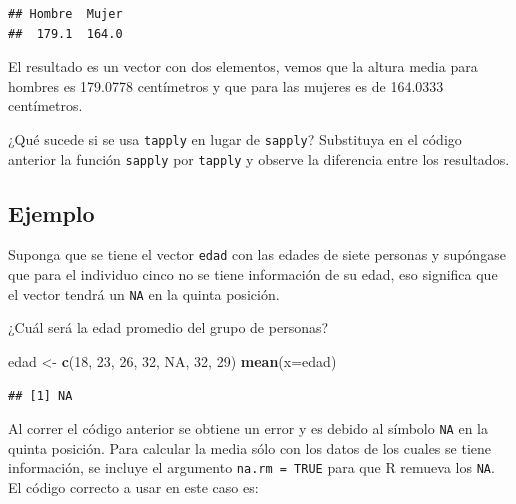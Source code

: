 \documentclass[10pt,]{krantz}
\makeatletter
\newenvironment{Shaded}{\begin{snugshade}}{\end{snugshade}}
\newcommand{\KeywordTok}[1]{\textcolor[rgb]{0.13,0.29,0.53}{\textbf{{#1}}}}
\newcommand{\DataTypeTok}[1]{\textcolor[rgb]{0.13,0.29,0.53}{{#1}}}
\newcommand{\DecValTok}[1]{\textcolor[rgb]{0.00,0.00,0.81}{{#1}}}
\newcommand{\StringTok}[1]{\textcolor[rgb]{0.31,0.60,0.02}{{#1}}}
\newcommand{\OtherTok}[1]{\textcolor[rgb]{0.56,0.35,0.01}{{#1}}}
\newcommand{\NormalTok}[1]{{#1}}
\newenvironment{kframe}{%
\medskip{}
\setlength{\fboxsep}{.8em}
 \def\at@end@of@kframe{}%
 \ifinner\ifhmode%
  \def\at@end@of@kframe{\end{minipage}}%
  \begin{minipage}{\columnwidth}%
 \fi\fi%
 \def\FrameCommand##1{\hskip\@totalleftmargin \hskip-\fboxsep
 \colorbox{shadecolor}{##1}\hskip-\fboxsep
     \hskip-\linewidth \hskip-\@totalleftmargin \hskip\columnwidth}%
 \MakeFramed {\advance\hsize-\width
   \@totalleftmargin\z@ \linewidth\hsize
   \@setminipage}}%
 {\par\unskip\endMakeFramed%
 \at@end@of@kframe}
\renewenvironment{Shaded}{\begin{kframe}}{\end{kframe}}
\makeatother
\begin{document}
\begin{Shaded}
\end{Shaded}

\begin{verbatim}
## Hombre  Mujer 
##  179.1  164.0
\end{verbatim}

El resultado es un vector con dos elementos, vemos que la altura media
para hombres es 179.0778 centímetros y que para las mujeres es de
164.0333 centímetros.

¿Qué sucede si se usa \texttt{tapply} en lugar de \texttt{sapply}?
Substituya en el código anterior la función \texttt{sapply} por
\texttt{tapply} y observe la diferencia entre los resultados.

\subsection*{Ejemplo}\label{ejemplo-2}


Suponga que se tiene el vector \texttt{edad} con las edades de siete
personas y supóngase que para el individuo cinco no se tiene información
de su edad, eso significa que el vector tendrá un \texttt{NA} en la
quinta posición.

¿Cuál será la edad promedio del grupo de personas?

\begin{Shaded}
\begin{Highlighting}[]
\NormalTok{edad <-}\StringTok{ }\KeywordTok{c}\NormalTok{(}\DecValTok{18}\NormalTok{, }\DecValTok{23}\NormalTok{, }\DecValTok{26}\NormalTok{, }\DecValTok{32}\NormalTok{, }\OtherTok{NA}\NormalTok{, }\DecValTok{32}\NormalTok{, }\DecValTok{29}\NormalTok{)}
\KeywordTok{mean}\NormalTok{(}\DataTypeTok{x=}\NormalTok{edad)}
\end{Highlighting}
\end{Shaded}

\begin{verbatim}
## [1] NA
\end{verbatim}

Al correr el código anterior se obtiene un error y es debido al símbolo
\texttt{NA} en la quinta posición. Para calcular la media sólo con los
datos de los cuales se tiene información, se incluye el argumento
\texttt{na.rm\ =\ TRUE} para que R remueva los \texttt{NA}. El código
correcto a usar en este caso es:
\end{document}
